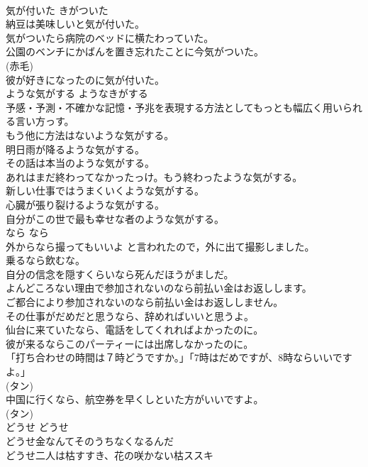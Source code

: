 \documentclass[8pt]{extreport}
\begin{document}
\begin{CJK}{UTF8}{min}
\\	気が付いた	きがついた	
\\	納豆は美味しいと気が付いた。  
\\	気がついたら病院のベッドに横たわっていた。  
\\	公園のベンチにかばんを置き忘れたことに今気がついた。  
\\	(赤毛)
\\	彼が好きになったのに気が付いた。  
\\	ような気がする	ようなきがする	
\\	予感・予測・不確かな記憶・予兆を表現する方法としてもっとも幅広く用いられる言い方っす。	
\\	もう他に方法はないような気がする。   
\\	明日雨が降るような気がする。  
\\	その話は本当のような気がする。   
\\	あれはまだ終わってなかったっけ。もう終わったような気がする。  
\\	新しい仕事ではうまくいくような気がする。   
\\	心臓が張り裂けるような気がする。   
\\	自分がこの世で最も幸せな者のような気がする。  
\\	なら	なら	
\\	外からなら撮ってもいいよ と言われたので，外に出て撮影しました。  
\\	乗るなら飲むな。  
\\	自分の信念を隠すくらいなら死んだほうがましだ。   
\\	よんどころない理由で参加されないのなら前払い金はお返しします。  
\\	ご都合により参加されないのなら前払い金はお返ししません。  
\\	その仕事がだめだと思うなら、辞めればいいと思うよ。  
\\	仙台に来ていたなら、電話をしてくれればよかったのに。   
\\	彼が来るならこのパーティーには出席しなかったのに。   
\\	「打ち合わせの時間は７時どうですか。」「7時はだめですが、8時ならいいですよ。」   
\\	(タン)
\\	中国に行くなら、航空券を早くしといた方がいいですよ。  
\\	(タン)
\\	どうせ	どうせ	
\\	どうせ金なんてそのうちなくなるんだ  
\\	どうせ二人は枯すすき、花の咲かない枯ススキ  

\end{CJK}
\end{document}
